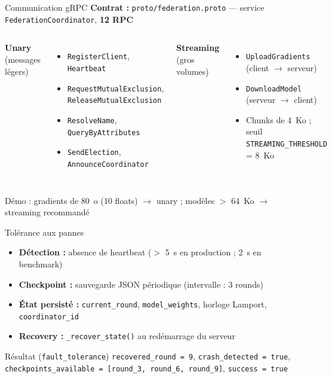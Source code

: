 \documentclass[11pt,french]{beamer}
\begin{document}
\begin{frame}{Communication gRPC}
  \textbf{Contrat :} \texttt{proto/federation.proto} --- service \texttt{FederationCoordinator}, \textbf{12 RPC}

  \vspace{0.3cm}
  \begin{columns}[T]
    \textbf{Unary} (messages légers)
    \begin{itemize}\small
      \item \texttt{RegisterClient}, \texttt{Heartbeat}
      \item \texttt{RequestMutualExclusion}, \texttt{ReleaseMutualExclusion}
      \item \texttt{ResolveName}, \texttt{QueryByAttributes}
      \item \texttt{SendElection}, \texttt{AnnounceCoordinator}
    \end{itemize}

    \textbf{Streaming} (gros volumes)
    \begin{itemize}\small
      \item \texttt{UploadGradients} (client $\rightarrow$ serveur)
      \item \texttt{DownloadModel} (serveur $\rightarrow$ client)
      \item Chunks de 4~Ko ; seuil \texttt{STREAMING\_THRESHOLD} = 8~Ko
    \end{itemize}
  \end{columns}

  \vspace{0.4cm}
  \small
  Démo : gradients de 80~o (10 floats) $\rightarrow$ unary ;
  modèles $>$ 64~Ko $\rightarrow$ streaming recommandé
\end{frame}

\begin{frame}{Tolérance aux pannes}
  \begin{itemize}
    \item \textbf{Détection :} absence de heartbeat ($>$ 5~s en production ; 2~s en benchmark)
    \item \textbf{Checkpoint :} sauvegarde JSON périodique (intervalle : 3 rounds)
    \item \textbf{État persisté :} \texttt{current\_round}, \texttt{model\_weights}, horloge Lamport, \texttt{coordinator\_id}
    \item \textbf{Recovery :} \texttt{\_recover\_state()} au redémarrage du serveur
  \end{itemize}

  \vspace{0.4cm}
  \begin{block}{Résultat (\texttt{fault\_tolerance})}
    \texttt{recovered\_round = 9}, \texttt{crash\_detected = true}, \\
    \texttt{checkpoints\_available = [round\_3, round\_6, round\_9]}, \texttt{success = true}
  \end{block}
\end{frame}
\end{document}
